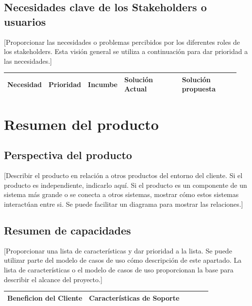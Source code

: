 \documentclass[11pt]{article}
\begin{document}
\subsection{Necesidades clave de los Stakeholders o usuarios}
[Proporcionar las necesidades o problemas percibidos por los diferentes roles de los stakeholders. Esta visión general se utiliza a continuación para dar prioridad a las necesidades.]
          
\begin{table}[H]
  \centering
  \begin{tabular}{p{0.15\linewidth}p{0.15\linewidth}p{0.15\linewidth}p{0.25\linewidth}p{0.25\linewidth}}
    \toprule
    \textbf{Necesidad} & \textbf{Prioridad} & \textbf{Incumbe} & \textbf{Solución Actual} & \textbf{Solución propuesta} \\
    \midrule
    \bottomrule
  \end{tabular}
\end{table}
\newpage

\section{Resumen del producto}\label{4}
\subsection{Perspectiva del producto}
[Describir el producto en relación a otros productos del entorno del cliente. Si el producto es independiente, indicarlo aquí. Si el producto es un componente de un sistema más grande o se conecta a otros sistemas, mostrar cómo estos sistemas interactúan entre si. Se puede facilitar un diagrama para mostrar las relaciones.]


\subsection{Resumen de capacidades}
[Proporcionar una lista de características y dar prioridad a la lista. Se puede utilizar parte del modelo de casos de uso cómo descripción de este apartado. La lista de características o el modelo de casos de uso proporcionan la base para describir el alcance del proyecto.]

\begin{table}[H]
  \centering
  \begin{tabular}{p{0.4\linewidth}p{0.6\linewidth}}
    \toprule
    \textbf{Beneficion del Cliente} & \textbf{Características de Soporte} \\
    \midrule
    \bottomrule
  \end{tabular}
\end{table}
\end{document}
